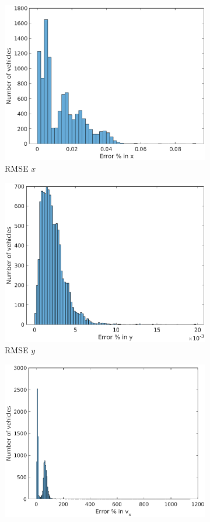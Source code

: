 \begin{figure}[h!]
\begin{subfigure}{.5\textwidth}
\centering
\includegraphics[width=.8\linewidth]{figures/s_caXerror}
\caption{RMSE $x$}
\end{subfigure}
\begin{subfigure}{.5\textwidth}
\centering
\includegraphics[width=.8\linewidth]{figures/s_caYerror}
\caption{RMSE $y$}
\end{subfigure}
\begin{subfigure}{.5\textwidth}
\centering
\includegraphics[width=.8\linewidth]{figures/s_cavXerror}

\end{subfigure}
\end{figure}
